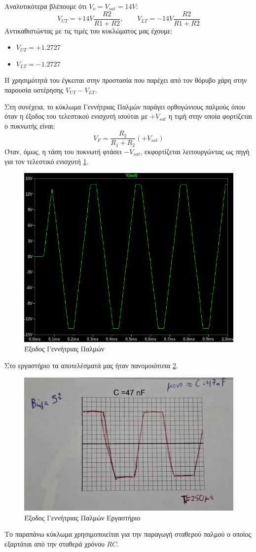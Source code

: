 \documentclass[11pt,a4paper,twoside,onecolumn,openright,final]{memoir}
\begin{document}
Αναλυτικότερα βλέπουμε ότι $V_o=V_{sat}=14V$: 
$$V_{UT}=+14V\frac{R2}{R1+R2}, \quad\quad V_{LT}=-14V\frac{R2}{R1+R2}$$
Αντικαθιστώντας με τις τιμές του κυκλώματος μας έχουμε:
\begin{itemize}
    \item $V_{UT}=+1.2727$
    \item $V_{LT}=-1.2727$
\end{itemize}
Η χρησιμότητά του έγκειται στην προστασία που παρέχει από τον θόρυβο χάρη στην παρουσία υστέρησης $V_{UT} - V_{LT}$.


Στη συνέχεια, το κύκλωμα Γεννήτριας Παλμών παράγει ορθογώνιους παλμούς όπου όταν η έξοδος του
τελεστικού ενισχυτή ισούται με $+V_{sat}$ η τιμή στην οποία φορτίζεται ο πυκνωτής είναι:
$$ V_F = \frac{R_2}{R_1 +R_2} (+V_{sat})$$
Όταν, όμως, η τάση του πυκνωτή φτάσει $-V_{sat}$, εκφορτίζεται λειτουργώντας ως πηγή για τον τελεστικό ενισχυτή \ref{fig:ex4plot2}.
\begin{figure}[H]
    \centering
    \includegraphics[width=0.8\linewidth]{figures/Exercise4_step5_47n.png}
    \caption{Έξοδος Γεννήτριας Παλμών}
    \label{fig:ex4plot2}
\end{figure}
Στο εργαστήριο τα αποτελέσματά μας ήταν πανομοιότυπα \ref{fig:ex4lab2}.
\begin{figure}[H]
    \centering
    \includegraphics[width=0.8\linewidth]{figures/Exercise4_lab_step5.jpg}
    \caption{Έξοδος Γεννήτριας Παλμών Εργαστήριο}
    \label{fig:ex4lab2}
\end{figure}
Το παραπάνω κύκλωμα χρησιμοποιείται για την παραγωγή σταθερού παλμού ο οποίος εξαρτάται από την σταθερά χρόνου $RC$.
\end{document}
